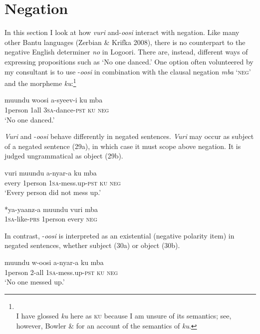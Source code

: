 \documentclass[output=paper]{langsci/langscibook}
\begin{document}
\section{Negation}

  In this section I look at how \textit{vuri} and-\textit{oosi} interact with negation. Like many other Bantu languages (Zerbian \& Krifka 2008), there is no counterpart to the negative English determiner \textit{no} in Logoori. There are, instead, different ways of expressing propositions such as ‘No one danced.’ One option often volunteered by my consultant is to use -\textit{oosi} in combination with the clausal negation \textit{mba} ‘\textsc{neg}’\textit{} and the morpheme \textit{ku}:\footnote{\\
 I have glossed \textit{ku} here as \textsc{ku} because I am unsure of its semantics; see, however, Bowler \& \citet{Gluckman2015} for an account of the semantics of \textit{ku}.}

\ea
\gll muundu   woosi  a-syeev-i    ku  mba\\
     1person\textsc{}    1all    3\textsc{sa}{}-dance-\textsc{pst}  \textsc{ku}  \textsc{neg} \\
\glt ‘No one danced.’
\z

  \textit{Vuri} and -\textit{oosi} behave differently in negated sentences. \textit{Vuri} may occur as subject of a negated sentence (29a), in which case it must scope above negation. It is judged ungrammatical as object (29b).

\ea 
\gll vuri  muundu  a-nyar-a    ku  mba  \\
     every  1person  1\textsc{sa}{}-mess.up-\textsc{pst}  \textsc{ku}  \textsc{neg}\\
\glt ‘Every person did not mess up.’       \textit{} 
\z

\ea
\gll \textup{*}ya-yaanz-a  muundu   vuri    mba \\
     1\textsc{sa}{}-like-\textsc{prs}  1person     every    \textsc{neg}\\
\z

  In contrast, -\textit{oosi} is interpreted as an existential (negative polarity item) in negated sentences, whether subject (30a) or object (30b).

\ea 
\gll muundu  w-oosi    a-nyar-a    ku  mba  \\
     1person  2-all    1\textsc{sa}{}-mess.up-\textsc{pst}  \textsc{ku  neg}\\
\glt ‘No one messed up.’       \textit{} 
\z
\end{document}
